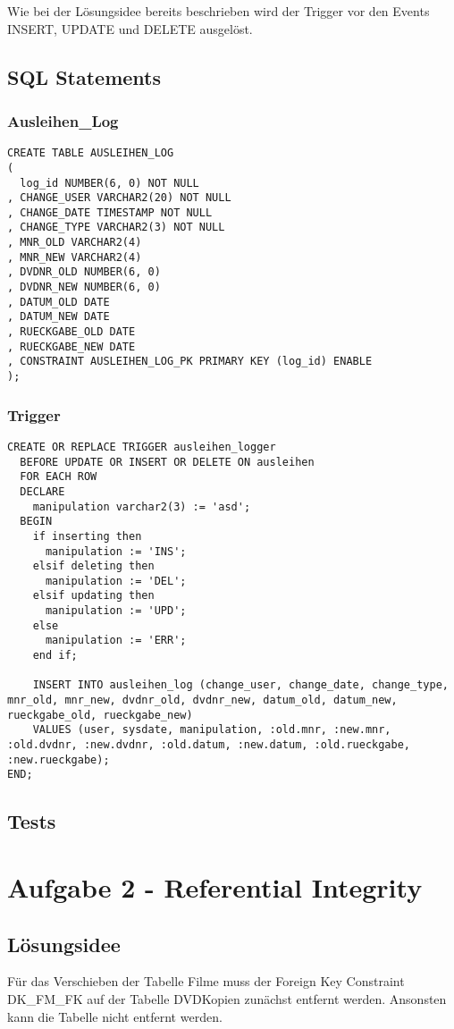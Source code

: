 \documentclass[11pt,a4paper,parskip=half]{scrartcl}
\begin{document}
Wie bei der Lösungsidee bereits beschrieben wird der Trigger vor den Events INSERT, UPDATE und DELETE ausgelöst.

\subsection{SQL Statements}
\subsubsection{Ausleihen\_Log}
\begin{lstlisting}
CREATE TABLE AUSLEIHEN_LOG
(
  log_id NUMBER(6, 0) NOT NULL 
, CHANGE_USER VARCHAR2(20) NOT NULL 
, CHANGE_DATE TIMESTAMP NOT NULL 
, CHANGE_TYPE VARCHAR2(3) NOT NULL
, MNR_OLD VARCHAR2(4)
, MNR_NEW VARCHAR2(4)
, DVDNR_OLD NUMBER(6, 0)
, DVDNR_NEW NUMBER(6, 0)
, DATUM_OLD DATE
, DATUM_NEW DATE
, RUECKGABE_OLD DATE 
, RUECKGABE_NEW DATE 
, CONSTRAINT AUSLEIHEN_LOG_PK PRIMARY KEY (log_id) ENABLE 
);
\end{lstlisting}

\subsubsection{Trigger}
\begin{lstlisting}
CREATE OR REPLACE TRIGGER ausleihen_logger
  BEFORE UPDATE OR INSERT OR DELETE ON ausleihen
  FOR EACH ROW
  DECLARE
    manipulation varchar2(3) := 'asd';
  BEGIN
    if inserting then
      manipulation := 'INS';
    elsif deleting then
      manipulation := 'DEL';
    elsif updating then
      manipulation := 'UPD';
    else 
      manipulation := 'ERR';
    end if;
    
    INSERT INTO ausleihen_log (change_user, change_date, change_type, mnr_old, mnr_new, dvdnr_old, dvdnr_new, datum_old, datum_new, rueckgabe_old, rueckgabe_new) 
    VALUES (user, sysdate, manipulation, :old.mnr, :new.mnr, :old.dvdnr, :new.dvdnr, :old.datum, :new.datum, :old.rueckgabe, :new.rueckgabe);
END;
\end{lstlisting}

\subsection{Tests}


\section{Aufgabe 2 - Referential Integrity}
\subsection{Lösungsidee}
Für das Verschieben der Tabelle \glqq{}Filme\grqq{} muss der Foreign Key Constraint \glqq{}DK\_FM\_FK\grqq{} auf der Tabelle \glqq{}DVDKopien\grqq{} zunächst entfernt werden. Ansonsten kann die Tabelle nicht entfernt werden.
\end{document}
